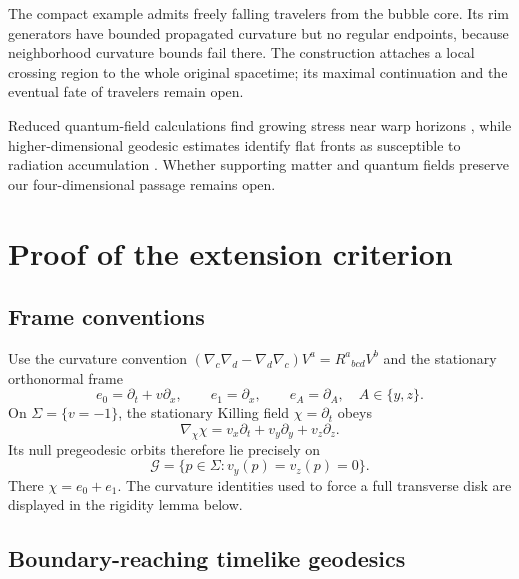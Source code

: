 \documentclass[10pt]{article}
\begin{document}
The compact example admits freely falling travelers from the bubble core.
Its rim generators have bounded propagated curvature but no regular
endpoints, because neighborhood curvature bounds fail there.
The construction attaches a local crossing region to the whole original
spacetime; its maximal continuation and the eventual fate of travelers
remain open.

Reduced quantum-field calculations find growing stress near warp horizons
\cite{FinazziLiberatiBarcelo2009},
while higher-dimensional geodesic estimates identify flat fronts as
susceptible to radiation accumulation \cite[Sec.~3.3]{BarceloEtAl2022}.
Whether supporting matter and quantum fields preserve our four-dimensional
passage remains open.

\appendix

\section{Proof of the extension criterion}
\label{app:global-proof}

\subsection{Frame conventions}

Use the curvature convention
\((\nabla_c\nabla_d-\nabla_d\nabla_c)V^a=R^a{}_{bcd}V^b\) and the
stationary orthonormal frame
\begin{equation}
  e_0=\partial_t+v\partial_x,\qquad e_1=\partial_x,
  \qquad e_A=\partial_A,\quad A\in\{y,z\}.
  \label{eq:stationary-frame}
\end{equation}
On \(\Sigma=\{v=-1\}\), the stationary Killing field
\(\chi=\partial_t\) obeys
\begin{equation}
  \nabla_\chi\chi=v_x\partial_t+v_y\partial_y+v_z\partial_z.
  \label{eq:not-whole-sphere}
\end{equation}
Its null pregeodesic orbits therefore lie precisely on
\begin{equation}
  \mathcal G=\{p\in\Sigma:v_y(p)=v_z(p)=0\}.
  \label{eq:generator-locus}
\end{equation}
There \(\chi=e_0+e_1\).  The curvature identities used to force a full
transverse disk are displayed in the rigidity lemma below.

\subsection{Boundary-reaching timelike geodesics}
\end{document}
